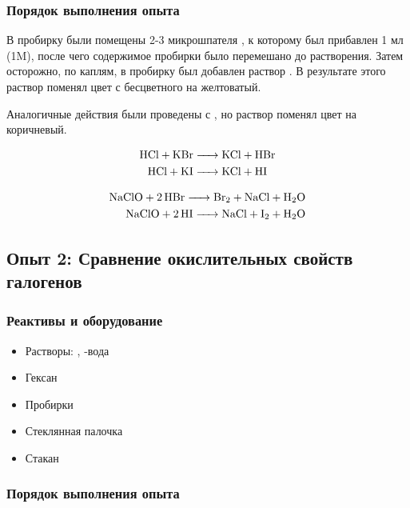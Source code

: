 \documentclass[a4paper, 12pt]{article}
\begin{document}
\subsubsection{Порядок выполнения опыта}

В пробирку были помещены 2-3 микрошпателя , к которому был прибавлен 1 мл  (1M), после чего содержимое пробирки было перемешано до растворения. Затем осторожно, по каплям, в пробирку был добавлен раствор . В результате этого раствор поменял цвет с бесцветного на желтоватый.

Аналогичные действия были проведены с , но раствор поменял цвет на коричневый.

\begin{align}
	\ce{HCl + KBr &-> KCl + HBr}\\
	\ce{HCl + KI &-> KCl + HI}
\end{align}

\begin{align}
	\ce{NaClO + 2HBr -> Br2 + NaCl + H2O}\\
	\ce{NaClO + 2HI -> NaCl + I2 + H2O}
\end{align}


\subsection{Опыт 2: Сравнение окислительных свойств галогенов}

\subsubsection{Реактивы и оборудование}

\begin{itemize}
	\item Растворы: , -вода
	
	\item Гексан
	
	\item Пробирки
	
	\item Стеклянная палочка
	
	\item Стакан
\end{itemize}

\subsubsection{Порядок выполнения опыта}
\end{document}
